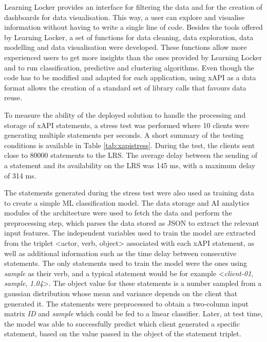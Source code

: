Learning Locker provides an interface for filtering the data and for the creation of dashboards for data visualisation. This way, a user can explore and visualise information without having to write a single line of code. Besides the tools offered by Learning Locker, a set of functions for data cleaning, data exploration, data modelling and data visualisation were developed. These functions allow more experienced users to get more insights than the ones provided by Learning Locker and to run classification, predictive and clustering algorithms. Even though the code has to be modified and adapted for each application, using xAPI as a data format allows the creation of a standard set of library calls that favours data reuse.

To measure the ability of the deployed solution to handle the processing and storage of xAPI statements, a stress test was performed where 10 clients were generating multiple statements per seconds. A short summary of the testing conditions is available in Table \ref{tab:xapistress}. During the test, the clients sent close to 80000 statements to the LRS. The average delay between the sending of a statement and its availability on the LRS was 145 ms, with a maximum delay of 314 ms. 

The statements generated during the stress test were also used as training data to create a simple ML classification model. The data storage and AI analytics modules of the architecture were used to fetch the data and perform the preprocessing step, which parses the data stored as JSON to extract the relevant input features. The independent variables used to train the model are extracted from the triplet \textless actor, verb, object\textgreater{} associated with each xAPI statement, as well as additional information such as the time delay between consecutive statements. The only statements used to train the model were the ones using \textit{sample} as their verb, and a typical statement would be for example \textless \emph{client-01}, \textit{sample}, \emph{1.04}\textgreater{}. The object value for these statements is a number sampled from a gaussian distribution whose mean and variance depends on the client that generated it. The statements were preprocessed to obtain a two-column input matrix \textendash{} \emph{ID} and \emph{sample} \textendash{} which could be fed to a linear classifier. Later, at test time, the model was able to successfully predict which client generated a specific statement, based on the value passed in the object of the statement triplet.

